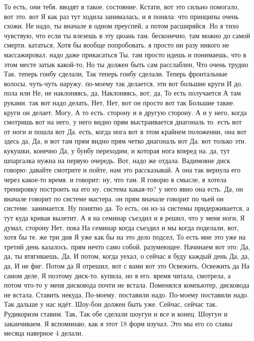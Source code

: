 То есть, они тебя.
вводят в такое.
состояние. Кстати, вот это сильно помогало, вот это. вот Я как раз тут ходила занималась, и я поняла:
что принципы очень схожи.
Не надо, ты вначале в одном преуспей, а потом расширяйся. Но я тихо чувствую, что если
ты влезешь в эту цюань там.
бесконечно, там можно до самой смерти.
кататься, Хотя бы вообще попробовать. я просто ни разу никого не массажировал.
надо даже прикасаться Ты.
там просто идешь и понимаешь, что в
этом месте затык какой-то, Но ты должен быть сам расслаблен, Что очень трудно Так.
теперь гонбу сделали, Так теперь гонбу сделали. Теперь фронтальные волосы.
чуть-чуть наружу. по-моему так делается.
эти вот большие круги И до.
пола или Не, не наклоняясь, да, Наклоняясь, вот, да, То есть получается А там руками. так вот надо делать, Нет, Нет, вот он просто вот так Большие такие.
круги он делает. Могу, А то есть.
сторону и в другую сторону.
А и у него, когда смотришь вот на него, у него видно прям выстраивается диагональ то.
есть вот от ноги и пошла вот Да.
есть, когда нога вот в этом крайнем положении, она вот здесь да, Да, и вот там прям видно прям четко диагональ вот Да.
вот только эти.
кукушки, конечно Да, у бунбу переходим, и которая нога вперед на.
да, тут шпаргалка нужна на первую очередь.
Вот, надо же отдала.
Вадимовне диск говорю: давайте смотрите и пойте, нам это рассказывай. А она так вернула его через какое-то время.
и говорит: ну, что там.
Я говорю в смысле, я хотела тренировку построить на его ну.
система какая-то? у него явно она есть. Да, он вначале говорит по системе мастера. он прям вначале говорит по чьей он системе.
занимается. Ну понятно да. То есть, он из-за системы придерживается, а тут куда кривая вылетит.
А я на семинар съездил и я решил, что у меня ноги, Я думал, сторону Нет. пока На семинар когда съездил и мы когда поделали, вот,
хотя бы те.
же три дня Я уже как бы на это дело подсел, То есть мне это уже на третий день казалось.
прям нечто само собой.
разумеющее. Начинаем вот это: Да, да, ты втягиваешь, Да, И потом, когда уехал,
о сейчас я буду каждый день Да, да, да, И не фиг. Потом да Я отрешил, вот с вами вот это Освежить, Освежить да На самом деле, Я поэтому диск-то.
купила, но я его.
время читала, смотрела, а потом что-то у меня дисковода почти не встала. Поменялся компьютер, дисковода не встала.
Ставить некуда, По-моему.
поставили надо.
По-моему поставили надо.
Так дальше у нас идёт.
Шоу-бон должен быть уже.
Сейчас, сейчас так.
Рудикоризм ставим.
Так, Так обе сделали шоугун и все и конец.
Шоугун и заканчиваем.
Я вспоминаю, как я этот 18 форм изучал.
Это мы его со славы месяца наверное 4 делали.
